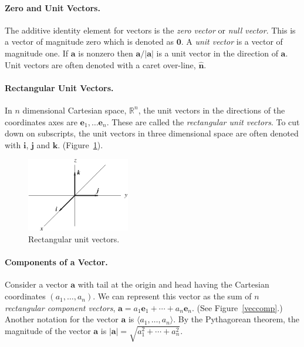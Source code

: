 \paragraph{Zero and Unit Vectors.}
The additive identity element for vectors is the \textit{zero vector} or
\textit{null vector}.  This is a vector of magnitude zero which is denoted
as $\mathbf{0}$.  A \textit{unit vector} is a vector of magnitude one.  If
$\mathbf{a}$ is nonzero then $\mathbf{a} / | \mathbf{a} |$ is a unit vector
in the direction of $\mathbf{a}$.  Unit vectors are often denoted with a caret
over-line, $\hat{\mathbf{n}}$.




\paragraph{Rectangular Unit Vectors.}
In $n$ dimensional Cartesian space, $\mathbb{R}^n$, the unit vectors in the 
directions of the coordinates axes are $\mathbf{e}_1, \ldots \mathbf{e}_n$.
These are called the \textit{rectangular unit vectors}. 
To cut down on subscripts, the unit vectors in three dimensional space 
are often denoted with $\mathbf{i}$, $\mathbf{j}$ and $\mathbf{k}$.  
(Figure~\ref{rectvec}).

\begin{figure}[htb!]
\begin{center}
  \includegraphics[width=0.4\textwidth]{algebra/vectors/rectvec}
\end{center}
\caption{Rectangular unit vectors.}
\label{rectvec}
\end{figure}



\paragraph{Components of a Vector.}
Consider a vector $\mathbf{a}$ with tail at the origin and head having the 
Cartesian coordinates $(a_1, \ldots, a_n)$.  We can represent this vector
as the sum of $n$ \textit{rectangular component vectors}, 
$\mathbf{a} = a_1 \mathbf{e}_1 + \cdots + a_n \mathbf{e}_n$.
(See Figure~\ref{veccomp}.)
Another notation for the vector $\mathbf{a}$ is $\langle a_1, \ldots, a_n \rangle$.
By the Pythagorean theorem, the magnitude of the vector $\mathbf{a}$ is
$| \mathbf{a} | = \sqrt{a_1^2 + \cdots + a_n^2}$.

